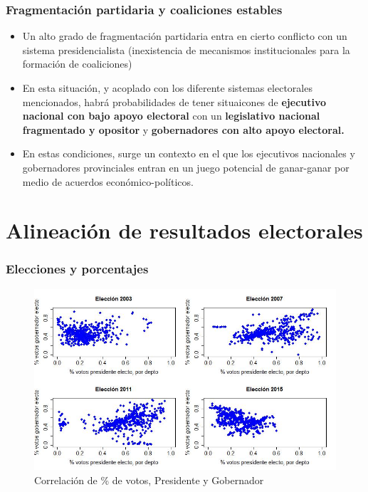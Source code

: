 \documentclass[a4paper,handout,mathserif,final,xcolor=dvipsnames,twocolumn]{beamer}
\begin{document}
    \begin{frame}\frametitle{Fragmentación partidaria y coaliciones estables}
      \begin{itemize}\itemsep 10pt
        \item Un alto grado de fragmentación partidaria entra en
          cierto conflicto con un sistema presidencialista
          (inexistencia de mecanismos institucionales para la
          formación de coaliciones)
          \item En esta situación, y acoplado con los diferente
            sistemas electorales mencionados, habrá probabilidades de
            tener situaicones de \textbf{ejecutivo nacional con bajo
              apoyo electoral} con un
            \textbf{legislativo nacional fragmentado y opositor} y \textbf{gobernadores
              con alto apoyo electoral.}
            \item En estas condiciones, surge un contexto en el que
              los ejecutivos nacionales y gobernadores provinciales
              entran en un juego potencial de ganar-ganar por medio de
              acuerdos económico-políticos. 
            \end{itemize}
      \end{frame}

      
\section{Alineación de resultados electorales}
          
\begin{frame}\frametitle{Elecciones y porcentajes}
  \begin{figure}[htbp]
    \centering \vspace{-0.5cm}
    \includegraphics[scale=0.375]{correlacion2}
    \caption{Correlación de \% de votos, Presidente y Gobernador}
    \label{fig:1}
  \end{figure}
\end{frame}
\end{document}
